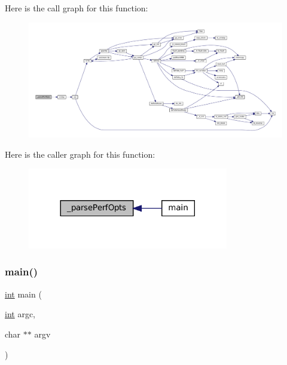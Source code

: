 Here is the call graph for this function\+:
\nopagebreak
\begin{figure}[H]
\begin{center}
\leavevmode
\includegraphics[width=350pt]{perf-main_8c_a95bd03ff14c9138daf9f88703ab5d5f7_cgraph}
\end{center}
\end{figure}
Here is the caller graph for this function\+:
\nopagebreak
\begin{figure}[H]
\begin{center}
\leavevmode
\includegraphics[width=248pt]{perf-main_8c_a95bd03ff14c9138daf9f88703ab5d5f7_icgraph}
\end{center}
\end{figure}
\mbox{\label{perf-main_8c_a3c04138a5bfe5d72780bb7e82a18e627}} 
\subsubsection{\texorpdfstring{main()}{main()}}
{\footnotesize\ttfamily \mbox{\hyperlink{ioapi_8h_a787fa3cf048117ba7123753c1e74fcd6}{int}} main (\begin{DoxyParamCaption}\item[{\mbox{\hyperlink{ioapi_8h_a787fa3cf048117ba7123753c1e74fcd6}{int}}}]{argc,  }\item[{char $\ast$$\ast$}]{argv }\end{DoxyParamCaption})}

